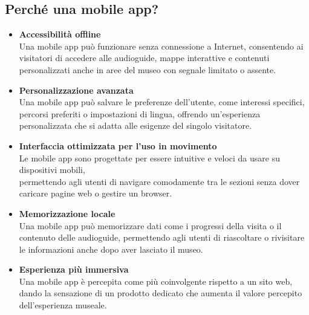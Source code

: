 \documentclass{article}
\begin{document}
\subsection{Perché una mobile app?}
\begin{itemize}
\item \textbf{Accessibilità offline} \\
Una mobile app può funzionare senza connessione a Internet, consentendo ai visitatori di accedere alle audioguide, mappe interattive e contenuti personalizzati anche in aree del museo con segnale limitato o assente.

\item \textbf{Personalizzazione avanzata} \\
Una mobile app può salvare le preferenze dell'utente, come interessi specifici, percorsi preferiti o impostazioni di lingua, offrendo un'esperienza personalizzata che si adatta alle esigenze del singolo visitatore.

\item \textbf{Interfaccia ottimizzata per l'uso in movimento} \\
Le mobile app sono progettate per essere intuitive e veloci da usare su dispositivi mobili, \\ permettendo agli utenti di navigare comodamente tra le sezioni senza dover caricare pagine web o gestire un browser.

\item \textbf{Memorizzazione locale} \\
Una mobile app può memorizzare dati come i progressi della visita o il contenuto delle audioguide, permettendo agli utenti di riascoltare o rivisitare le informazioni anche dopo aver lasciato il museo.

\item \textbf{Esperienza più immersiva} \\
Una mobile app è percepita come più coinvolgente rispetto a un sito web, dando la sensazione di un prodotto dedicato che aumenta il valore percepito dell'esperienza museale.

\end{itemize}
\end{document}
